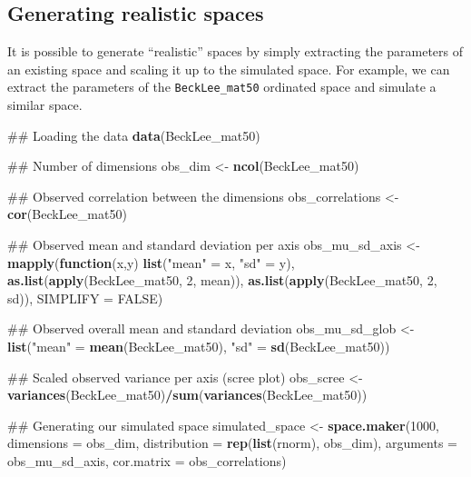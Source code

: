 \documentclass[]{book}
\newenvironment{Shaded}{\begin{snugshade}}{\end{snugshade}}
\newcommand{\KeywordTok}[1]{\textcolor[rgb]{0.13,0.29,0.53}{\textbf{#1}}}
\newcommand{\DataTypeTok}[1]{\textcolor[rgb]{0.13,0.29,0.53}{#1}}
\newcommand{\DecValTok}[1]{\textcolor[rgb]{0.00,0.00,0.81}{#1}}
\newcommand{\StringTok}[1]{\textcolor[rgb]{0.31,0.60,0.02}{#1}}
\newcommand{\OtherTok}[1]{\textcolor[rgb]{0.56,0.35,0.01}{#1}}
\newcommand{\ControlFlowTok}[1]{\textcolor[rgb]{0.13,0.29,0.53}{\textbf{#1}}}
\newcommand{\OperatorTok}[1]{\textcolor[rgb]{0.81,0.36,0.00}{\textbf{#1}}}
\newcommand{\NormalTok}[1]{#1}
\theoremstyle{definition}
\theoremstyle{definition}
\theoremstyle{definition}
\theoremstyle{remark}
\begin{document}
\subsection{Generating realistic
spaces}\label{generating-realistic-spaces}

It is possible to generate ``realistic'' spaces by simply extracting the
parameters of an existing space and scaling it up to the simulated
space. For example, we can extract the parameters of the
\texttt{BeckLee\_mat50} ordinated space and simulate a similar space.

\begin{Shaded}
\begin{Highlighting}[]
\NormalTok{## Loading the data}
\KeywordTok{data}\NormalTok{(BeckLee_mat50)}

\NormalTok{## Number of dimensions}
\NormalTok{obs_dim <-}\StringTok{ }\KeywordTok{ncol}\NormalTok{(BeckLee_mat50)}

\NormalTok{## Observed correlation between the dimensions}
\NormalTok{obs_correlations <-}\StringTok{ }\KeywordTok{cor}\NormalTok{(BeckLee_mat50)}

\NormalTok{## Observed mean and standard deviation per axis}
\NormalTok{obs_mu_sd_axis <-}\StringTok{ }\KeywordTok{mapply}\NormalTok{(}\ControlFlowTok{function}\NormalTok{(x,y) }\KeywordTok{list}\NormalTok{(}\StringTok{"mean"}\NormalTok{ =}\StringTok{ }\NormalTok{x, }\StringTok{"sd"}\NormalTok{ =}\StringTok{ }\NormalTok{y),}
                         \KeywordTok{as.list}\NormalTok{(}\KeywordTok{apply}\NormalTok{(BeckLee_mat50, }\DecValTok{2}\NormalTok{, mean)),}
                         \KeywordTok{as.list}\NormalTok{(}\KeywordTok{apply}\NormalTok{(BeckLee_mat50, }\DecValTok{2}\NormalTok{, sd)), }\DataTypeTok{SIMPLIFY =} \OtherTok{FALSE}\NormalTok{)}

\NormalTok{## Observed overall mean and standard deviation}
\NormalTok{obs_mu_sd_glob <-}\StringTok{ }\KeywordTok{list}\NormalTok{(}\StringTok{"mean"}\NormalTok{ =}\StringTok{ }\KeywordTok{mean}\NormalTok{(BeckLee_mat50), }\StringTok{"sd"}\NormalTok{ =}\StringTok{ }\KeywordTok{sd}\NormalTok{(BeckLee_mat50))}

\NormalTok{## Scaled observed variance per axis (scree plot)}
\NormalTok{obs_scree <-}\StringTok{ }\KeywordTok{variances}\NormalTok{(BeckLee_mat50)}\OperatorTok{/}\KeywordTok{sum}\NormalTok{(}\KeywordTok{variances}\NormalTok{(BeckLee_mat50))}

\NormalTok{## Generating our simulated space}
\NormalTok{simulated_space <-}\StringTok{ }\KeywordTok{space.maker}\NormalTok{(}\DecValTok{1000}\NormalTok{, }\DataTypeTok{dimensions =}\NormalTok{ obs_dim, }
                               \DataTypeTok{distribution =} \KeywordTok{rep}\NormalTok{(}\KeywordTok{list}\NormalTok{(rnorm), obs_dim),}
                               \DataTypeTok{arguments =}\NormalTok{ obs_mu_sd_axis,}
                               \DataTypeTok{cor.matrix =}\NormalTok{ obs_correlations)}


\end{Highlighting}
\end{Shaded}
\end{document}
